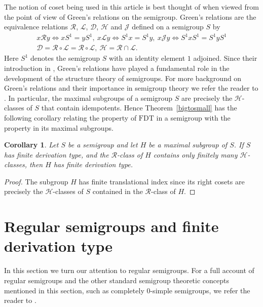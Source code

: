 \documentclass[11pt]{amsart}
\newtheorem{cor}{Corollary}
\theoremstyle{plain}
\begin{document}
The notion of coset being used in this article is best thought of when viewed from the point of view of Green's relations on the semigroup. Green's relations are the equivalence relations ${\mathcal{R}}$, ${\mathcal{L}}$, ${\mathcal{D}}$, ${\mathcal{H}}$ and  ${\mathcal{J}}$ defined on a semigroup $S$ by
\[
\begin{array}{c}
x {\mathcal{R}} y \Leftrightarrow xS^1 = yS^1, \ x {\mathcal{L}} y \Leftrightarrow S^1x = S^1y, \ x {\mathcal{J}} y \Leftrightarrow S^1xS^1 = S^1yS^1 \\
{\mathcal{D}} = {\mathcal{R}} \circ {\mathcal{L}} = {\mathcal{R}} \circ {\mathcal{L}}, \ {\mathcal{H}} = {\mathcal{R}} \cap {\mathcal{L}}.
\end{array}
\]
Here $S^1$ denotes the semigroup $S$ with an identity element $1$ adjoined. Since their introduction in \cite{Green1}, Green's relations have played a fundamental role in the development of the structure theory of semigroups. For more background on Green's relations and their importance in semigroup theory we refer the reader to \cite{Howie1}. In particular, the maximal subgroups of a semigroup $S$ are precisely the ${\mathcal{H}}$-classes of $S$ that contain idempotents. Hence Theorem~\ref{bigtosmall} has the following corollary relating  the property of $\mathrm{FDT}$ in a semigroup  with the property in its maximal subgroups.

\begin{cor}\label{maxsubgroupFDT}
Let $S$ be a semigroup  and let $H$ be a maximal subgroup of $S$. If $S$ has finite derivation type, and the ${\mathcal{R}}$-class of $H$ contains only finitely many ${\mathcal{H}}$-classes, then $H$ has finite derivation type.
\end{cor}
\begin{proof}
The subgroup $H$ has finite translational index since its right cosets are precisely the ${\mathcal{H}}$-classes of $S$ contained in the ${\mathcal{R}}$-class of $H$.
\end{proof}

\section{Regular semigroups and finite derivation type}

In this section we turn our attention to regular semigroups. For a full account of regular semigroups and the other standard semigroup theoretic concepts mentioned in this section, such as completely $0$-simple semigroups, we refer the reader to \cite{Howie1}.
\end{document}
